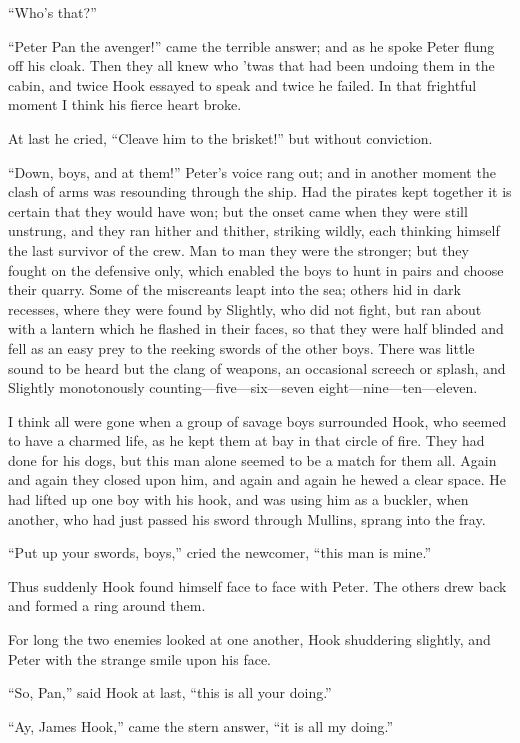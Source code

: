 “Who’s that?”

“Peter Pan the avenger!\@” came the terrible answer;
and as he spoke Peter flung off his cloak.
Then they all knew who ’twas that had been undoing them in the cabin,
and twice Hook essayed to speak and twice he failed.
In that frightful moment I think his fierce heart broke.

At last he cried, “Cleave him to the brisket!\@” but without conviction.

“Down, boys, and at them!\@” Peter’s voice rang out;
and in another moment the clash of arms was resounding through the ship.
Had the pirates kept together it is certain that they would have won;
but the onset came when they were still unstrung,
and they ran hither and thither, striking wildly,
each thinking himself the last survivor of the crew.
Man to man they were the stronger;
but they fought on the defensive only,
which enabled the boys to hunt in pairs and choose their quarry.
Some of the miscreants leapt into the sea;
others hid in dark recesses, where they were found by Slightly,
who did not fight, but ran about with a lantern which he flashed in their faces,
so that they were half blinded and fell as an easy prey to the reeking swords of the other boys.
There was little sound to be heard but the clang of weapons, an occasional screech or splash,
and Slightly monotonously counting—five—six—seven eight—nine—ten—eleven.

I think all were gone when a group of savage boys surrounded Hook,
who seemed to have a charmed life, as he kept them at bay in that circle of fire.
They had done for his dogs, but this man alone seemed to be a match for them all.
Again and again they closed upon him, and again and again he hewed a clear space.
He had lifted up one boy with his hook, and was using him as a buckler,
when another, who had just passed his sword through Mullins, sprang into the fray.

“Put up your swords, boys,” cried the newcomer, “this man is mine.”

Thus suddenly Hook found himself face to face with Peter.
The others drew back and formed a ring around them.

For long the two enemies looked at one another, Hook shuddering slightly,
and Peter with the strange smile upon his face.

“So, Pan,” said Hook at last, “this is all your doing.”

“Ay, James Hook,” came the stern answer, “it is all my doing.”

